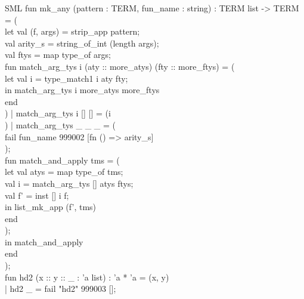\documentclass[11pt,a4paper]{article}
\begin{document}
\begin{GFT}{SML}
\+fun \PrNL{}mk\_any\PrNN{} (pattern : TERM, fun\_name : string) : TERM list -> TERM = (\\
\+	let	val (f, args) = strip\_app pattern;\\
\+		val arity\_s = string\_of\_int (length args);\\
\+		val ftys = map type\_of args;\\
\+		fun match\_arg\_tys i (aty :: more\_atys) (fty :: more\_ftys) = (\\
\+			let	val i = type\_match1 i aty fty;\\
\+			in	match\_arg\_tys i more\_atys more\_ftys\\
\+			end\\
\+		) | match\_arg\_tys i [] [] = (i\\
\+		) | match\_arg\_tys \_ \_ \_ = (\\
\+			fail fun\_name 999002 [fn () => arity\_s]\\
\+		);\\
\+		fun match\_and\_apply tms = (\\
\+			let	val atys = map type\_of tms;\\
\+				val i = match\_arg\_tys [] atys ftys;\\
\+				val f' = inst [] i f;\\
\+			in	list\_mk\_app (f', tms)\\
\+			end\\
\+		);\\
\+	in	match\_and\_apply\\
\+	end\\
\+);\\
\+fun \PrNL{}hd2\PrNN{} (x :: y :: \_ : 'a list) : 'a * 'a = (x, y)\\
\+|   hd2 \_ = fail "hd2" 999003 [];\\
\end{GFT}
\end{document}
